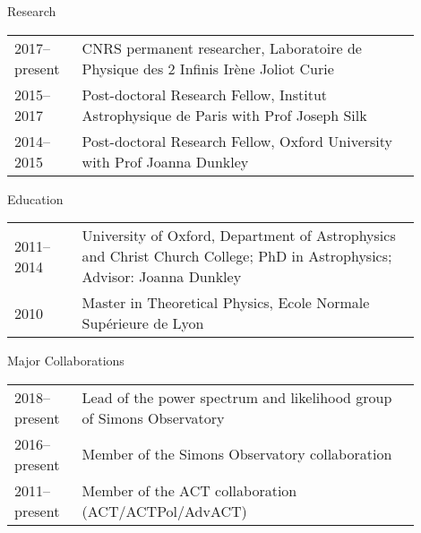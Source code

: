 \documentclass{resume} %
\begin{document}
\begin{rSection}{Research}
\vspace{-0.4cm}
\begin{table}[h]
{\def\arraystretch{1.5}\tabcolsep=0pt
\begin{tabular}{p{0.15\linewidth}p{0.75\linewidth}}
  2017--present & CNRS permanent researcher, Laboratoire de Physique des 2 Infinis Irène Joliot Curie \\
  2015--2017 & Post-doctoral Research Fellow, Institut Astrophysique de Paris with Prof Joseph Silk \\
  2014--2015 & Post-doctoral Research Fellow, Oxford University with Prof Joanna Dunkley \\
\end{tabular}%
}
\end{table}
\end{rSection}
\vspace{-0.6cm}


\begin{rSection}{Education}
\vspace{-0.4cm}
\begin{table}[h]
{\def\arraystretch{1.5}\tabcolsep=0pt
\begin{tabular}{p{0.15\linewidth}p{0.75\linewidth}}

2011--2014 & University of Oxford, Department of Astrophysics and Christ Church College;
PhD in Astrophysics;	Advisor: Joanna Dunkley \\
2010 & Master in Theoretical Physics, Ecole Normale Supérieure de Lyon \\

\end{tabular}%
}
\end{table}
\vspace{-0.6cm}
\end{rSection}

\begin{rSection}{Major Collaborations}
\vspace{-0.4cm}
\begin{table}[h]
{\def\arraystretch{1.5}\tabcolsep=0pt
\begin{tabular}{p{0.15\linewidth}p{0.75\linewidth}}
2018--present & Lead of the power spectrum and likelihood group of Simons Observatory \\
2016--present & Member of the Simons Observatory collaboration \\
2011--present & Member of the ACT collaboration (ACT/ACTPol/AdvACT) \\
\end{tabular}%
}
\end{table}
\vspace{-0.6cm}
\end{rSection}
\end{document}
